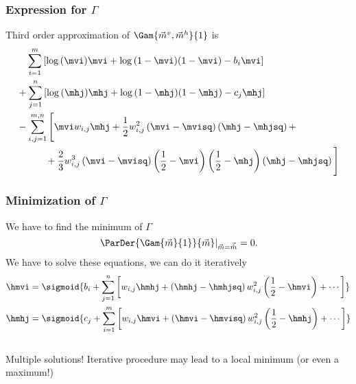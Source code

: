 \begin{frame}
  \begin{columns}[T]
    \centering  
    \centering
    \begin{figure}
      
    \end{figure}
  \end{columns}
\end{frame}

\begin{frame}
  \frametitle{Expression for \(\Gamma\)}
  Third order approximation of \(\Gam{\vec{m}^v, \vec{m}^h}{1}\) is
  \begin{align*}
    &\quad\sum_{i=1}^{m}\left[\log{\left(\mvi\right)}\mvi + \log{\left(1-\mvi\right)}(1-\mvi)-b_i\mvi\right]\\
    &+\sum_{j=1}^{n}\left[\log{\left(\mhj\right)}\mhj+\log{\left(1-\mhj\right)}(1-\mhj)-c_j\mhj\right]\\
    &-\sum_{i,j=1}^{m,n}\Bigg[
    \mvi w_{i,j}\mhj
    +\frac{1}{2}w_{i,j}^2\left(\mvi-\mvisq\right)\left(\mhj-\mhjsq\right)+\\
    &\qquad\quad+\frac{2}{3}w_{i,j}^3\left(\mvi-\mvisq\right)\left(\frac{1}{2}-\mvi\right)\left(\frac{1}{2}-\mhj\right)
    \left(\mhj-\mhjsq\right)\Bigg]
  \end{align*}
\end{frame}

\begin{frame}
  \frametitle{Minimization  of \(\Gamma\)}
  We have to find the minimum of \(\Gamma\)
  \[
  \left.\ParDer{\Gam{\vec{m}}{1}}{\vec{m}}\right|_{\vec{m}=\vec{\hat{m}}}=0.
  \]
  \pause
  We  have to solve these equations, we can do it iteratively
  \begin{align*}
    \hmvi&=\sigmoid{b_i + \sum_{j=1}^n\left[w_{i,j}\hmhj+
      \left(\hmhj-\hmhjsq\right)w^2_{i,j}\left(\frac{1}{2}-\hmvi\right)
      + \cdots \right]}\\
    \hmhj&=\sigmoid{c_j + \sum_{i=1}^m\left[w_{i,j}\hmvi+
      \left(\hmvi-\hmvisq\right)w^2_{i,j}\left(\frac{1}{2}-\hmhj\right)  + \cdots \right]}
  \end{align*}
	\pause
  \begin{columns}
    \begin{column}{0.7\textwidth}
      \begin{alertblock}{Multiple solutions!}
        Iterative procedure may lead to a local minimum (or even a maximum!)
      \end{alertblock}
    \end{column}
  \end{columns}
\end{frame}

